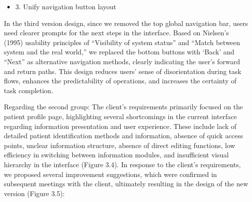 \begin{itemize}
    \item 3. Unify navigation button layout
\end{itemize}
In the third version design, since we removed the top global navigation bar, users need clearer prompts for the next steps in the interface. Based on Nielsen's (1995) usability principles of “Visibility of system status” and “Match between system and the real world,” we replaced the bottom buttons with ‘Back’ and “Next” as alternative navigation methods, clearly indicating the user's forward and return paths. This design reduces users' sense of disorientation during task flows, enhances the predictability of operations, and increases the certainty of task completion.

Regarding the second group: The client's requirements primarily focused on the patient profile page, highlighting several shortcomings in the current interface regarding information presentation and user experience. These include lack of detailed patient identification methods and information, absence of quick access points, unclear information structure, absence of direct editing functions, low efficiency in switching between information modules, and insufficient visual hierarchy in the interface (Figure 3.4). In response to the client's requirements, we proposed several improvement suggestions, which were confirmed in subsequent meetings with the client, ultimately resulting in the design of the new version (Figure 3.5):

